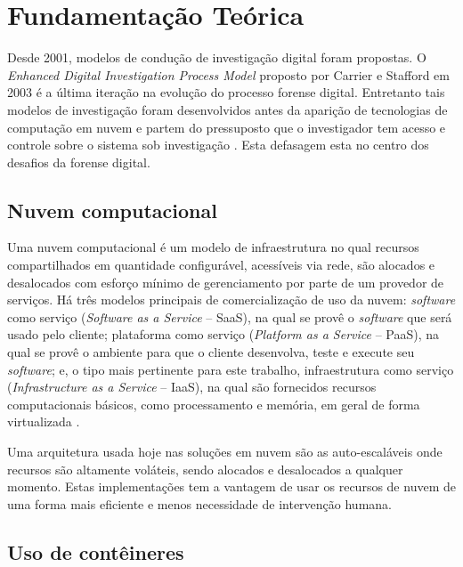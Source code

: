 \chapter{Fundamentação Teórica}
\label{chp:fundamentação}

Desde 2001, modelos de condução de investigação digital foram propostas. 
%
O \textit{Enhanced Digital Investigation Process Model} proposto por Carrier e Stafford em 2003 é a última iteração na evolução do processo forense digital.
%
Entretanto tais modelos de investigação foram desenvolvidos antes da aparição de tecnologias de computação em nuvem e partem do pressuposto que o investigador tem acesso e controle sobre o sistema sob investigação \cite{GrisposChallengesCloudComputing:2012}.
%
Esta defasagem esta no centro dos desafios da forense digital.

\section{Nuvem computacional}
\label{sec:computacaonuvem}

Uma nuvem computacional é um modelo de infraestrutura no qual recursos compartilhados em quantidade configurável, acessíveis via rede, são alocados e desalocados com esforço mínimo de gerenciamento por parte de um provedor de serviços.
%
Há três modelos principais de comercialização de uso da nuvem: \textit{software} como serviço (\textit{Software as a Service} -- SaaS), na qual se provê o \textit{software} que será usado pelo cliente; plataforma como serviço (\textit{Platform as a Service} -- PaaS), na qual se provê o ambiente para que o cliente desenvolva, teste e execute seu \textit{software}; e, o tipo mais pertinente para este trabalho, infraestrutura como serviço (\textit{Infrastructure as a Service} -- IaaS), na qual são fornecidos recursos computacionais básicos, como processamento e memória, em geral de forma virtualizada \cite{NIST2011}.

Uma arquitetura usada hoje nas soluções em nuvem são as auto-escaláveis onde recursos são altamente voláteis, sendo alocados e desalocados a qualquer momento. Estas implementações tem a vantagem de usar os recursos de nuvem de uma forma mais eficiente e menos necessidade de intervenção humana.


\section{Uso de contêineres}
\label{sec:conteiner}

